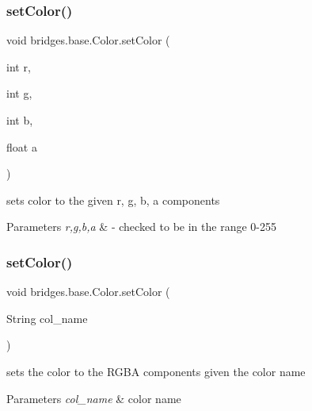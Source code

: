 \subsubsection{\texorpdfstring{set\+Color()}{setColor()}\hspace{0.1cm}{\footnotesize\ttfamily [1/2]}}
{\footnotesize\ttfamily void bridges.\+base.\+Color.\+set\+Color (\begin{DoxyParamCaption}\item[{int}]{r,  }\item[{int}]{g,  }\item[{int}]{b,  }\item[{float}]{a }\end{DoxyParamCaption})}

sets color to the given r, g, b, a components


\begin{DoxyParams}{Parameters}
{\em r,g,b,a} & -\/ checked to be in the range 0-\/255 \\
\hline
\end{DoxyParams}
\mbox{\label{classbridges_1_1base_1_1_color_a54dcd31227bde0f5d0a4f5d3b5a24ed2}} 
\subsubsection{\texorpdfstring{set\+Color()}{setColor()}\hspace{0.1cm}{\footnotesize\ttfamily [2/2]}}
{\footnotesize\ttfamily void bridges.\+base.\+Color.\+set\+Color (\begin{DoxyParamCaption}\item[{String}]{col\+\_\+name }\end{DoxyParamCaption})}

sets the color to the R\+G\+BA components given the color name


\begin{DoxyParams}{Parameters}
{\em col\+\_\+name} & color name \\
\hline
\end{DoxyParams}
\mbox{\label{classbridges_1_1base_1_1_color_a415a28133ade4e216c02ecdfc8a32a1d}} 
